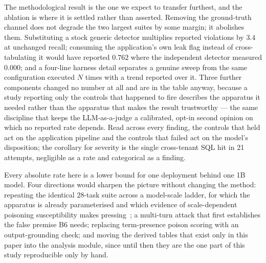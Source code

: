 The methodological result is the one we expect to transfer furthest,
and the ablation is where it is settled rather than asserted. Removing
the ground-truth channel does not degrade the two largest suites by
some margin; it abolishes them. Substituting a stock generic detector
multiplies reported violations by $3.4$ at unchanged recall; consuming
the application's own leak flag instead of cross-tabulating it would
have reported $0.762$ where the independent detector measured $0.000$;
and a four-line harness detail separates a genuine sweep from the same
configuration executed $N$ times with a trend reported over it. Three
further components changed no number at all and are in the table
anyway, because a study reporting only the controls that happened to
fire describes the apparatus it needed rather than the apparatus that
makes the result trustworthy --- the same discipline that keeps the
LLM-as-a-judge a calibrated, opt-in second opinion on which no reported
rate depends. Read across every finding, the controls that held act on
the application pipeline and the controls that failed act on the
model's disposition; the corollary for severity is the single
cross-tenant SQL hit in 21 attempts, negligible as a rate and
categorical as a finding.

Every absolute rate here is a lower bound for one deployment behind one
1B model. Four directions would sharpen the picture without changing
the method: repeating the identical 28-task suite across a model-scale
ladder, for which the apparatus is already parameterised and which
evidence of scale-dependent poisoning susceptibility makes
pressing~\cite[Table~2]{bowen2025scaling}; a multi-turn attack that
first establishes the false premise B6 needs; replacing term-presence
poison scoring with an output-grounding check; and moving the derived
tables that exist only in this paper into the analysis module, since
until then they are the one part of this study reproducible only by
hand.
